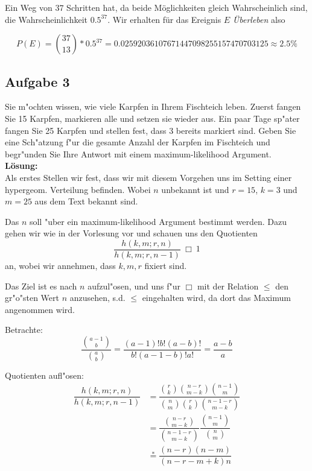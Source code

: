 \documentclass[11pt,a4paper,ngerman]{article}
\begin{document}
Ein Weg von $37$ Schritten hat, da beide Möglichkeiten gleich Wahrscheinlich sind, die Wahrscheinlichkeit $0.5^{37}$. Wir erhalten für
das Ereignis $E$ \emph{Überleben} also

\[
    P(E) = \binom{37}{13} * 0.5^{37} = 0.02592036107671447098255157470703125 \approx 2.5\%
\]

\subsection*{Aufgabe 3}

Sie m"ochten wissen, wie viele Karpfen in Ihrem Fischteich leben. Zuerst fangen
Sie 15 Karpfen, markieren alle und setzen sie wieder aus. Ein paar Tage sp"ater
fangen Sie 25 Karpfen und stellen fest, dass 3 bereits markiert sind. Geben Sie
eine Sch"atzung f"ur die gesamte Anzahl der Karpfen im Fischteich und begr"unden
Sie Ihre Antwort mit einem maximum-likelihood Argument. \\

\textbf{Lösung:}\\

Als erstes Stellen wir fest, dass wir mit diesem Vorgehen uns im Setting einer
hypergeom. Verteilung befinden. Wobei $n$ unbekannt ist und $r = 15$, $k=3$ und
$m = 25$ aus dem Text bekannt sind.

Das $n$ soll "uber ein maximum-likelihood Argument bestimmt werden. Dazu gehen
wir wie in der Vorlesung vor und schauen uns den Quotienten \[
  \dfrac{h(k,m;r,n)}{h(k,m;r,n-1)}\ \Box\ 1
\] an, wobei wir annehmen, dass $k,m,r$ fixiert sind.

Das Ziel ist es nach $n$ aufzul"osen, und uns f"ur $\Box$ mit der Relation $\le$
den gr"o"sten Wert $n$ anzusehen, s.d. $\le$ eingehalten wird, da dort das
Maximum angenommen wird.

Betrachte: \[
  \dfrac{\binom{a-1}{b}}{\binom{a}{b}} = \dfrac{(a-1)! b! (a-b)!}{b! (a-1-b)! a!}
  = \dfrac{a-b}{a} \tag*{*}
\]

Quotienten aufl"osen:
\begin{align}
  \dfrac{h(k,m;r,n)}{h(k,m;r,n-1)}
  &=
    \dfrac{
      \binom{r}{k}\binom{n-r}{m-k}\binom{n-1}{m}
    }{
      \binom{n}{m}\binom{r}{k}\binom{n-1-r}{m-k}
    } \\
  &=
    \dfrac{
      \binom{n-r}{m-k}
    }{
      \binom{n-1-r}{m-k}
    }
    \dfrac{
      \binom{n-1}{m}
    }{
      \binom{n}{m}
    } \\
  &\stackrel{*}{=}
    \dfrac{(n-r)(n-m)}{(n-r-m+k)n}
\end{align}
\end{document}
